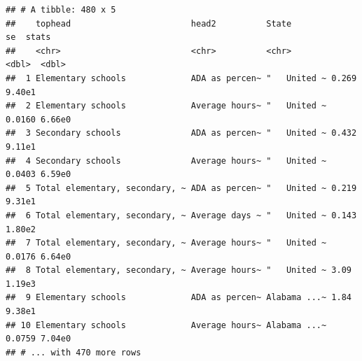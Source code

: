 \documentclass[12pt,letterpaperpaper,openany]{book}
\newenvironment{Shaded}{\begin{snugshade}}{\end{snugshade}}
\newcommand{\DataTypeTok}[1]{\textcolor[rgb]{0.13,0.29,0.53}{#1}}
\newcommand{\DecValTok}[1]{\textcolor[rgb]{0.00,0.00,0.81}{#1}}
\newcommand{\KeywordTok}[1]{\textcolor[rgb]{0.13,0.29,0.53}{\textbf{#1}}}
\newcommand{\NormalTok}[1]{#1}
\newcommand{\OperatorTok}[1]{\textcolor[rgb]{0.81,0.36,0.00}{\textbf{#1}}}
\newcommand{\StringTok}[1]{\textcolor[rgb]{0.31,0.60,0.02}{#1}}
\begin{document}
\begin{Shaded}
\end{Shaded}

\begin{verbatim}
## # A tibble: 480 x 5
##    tophead                        head2          State            se  stats
##    <chr>                          <chr>          <chr>         <dbl>  <dbl>
##  1 Elementary schools             ADA as percen~ "   United ~ 0.269  9.40e1
##  2 Elementary schools             Average hours~ "   United ~ 0.0160 6.66e0
##  3 Secondary schools              ADA as percen~ "   United ~ 0.432  9.11e1
##  4 Secondary schools              Average hours~ "   United ~ 0.0403 6.59e0
##  5 Total elementary, secondary, ~ ADA as percen~ "   United ~ 0.219  9.31e1
##  6 Total elementary, secondary, ~ Average days ~ "   United ~ 0.143  1.80e2
##  7 Total elementary, secondary, ~ Average hours~ "   United ~ 0.0176 6.64e0
##  8 Total elementary, secondary, ~ Average hours~ "   United ~ 3.09   1.19e3
##  9 Elementary schools             ADA as percen~ Alabama ...~ 1.84   9.38e1
## 10 Elementary schools             Average hours~ Alabama ...~ 0.0759 7.04e0
## # ... with 470 more rows
\end{verbatim}
\end{document}
